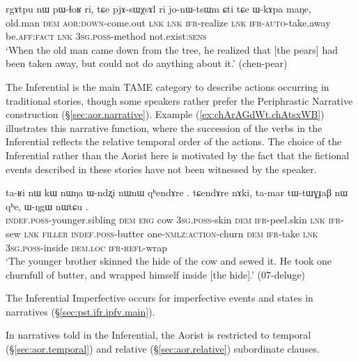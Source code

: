 \begin{exe}
\ex \label{ex:jonWtsWm.Cti}
\gll rgɤtpu nɯ pɯ-ɬoʁ ri, tɕe pjɤ-sɯχsɤl ri jo-nɯ-tsɯm ɕti tɕe ɯ-kɤpa maŋe,  \\
old.man \textsc{dem} \textsc{aor}:\textsc{down}-come.out \textsc{lnk} \textsc{lnk} \textsc{ifr}-realize \textsc{lnk} \textsc{ifr}-\textsc{auto}-take.away be.\textsc{aff}:\textsc{fact} \textsc{lnk} \textsc{3sg}.\textsc{poss}-method not.exist:\textsc{sens} \\
\glt `When the old man came down from the tree, he realized that [the pears] had been taken away, but could not do anything about it.' (chen-pear)
 \end{exe}

The Inferential is the main TAME category to describe actions occurring in traditional stories, though some speakers rather prefer the Periphrastic Narrative construction (§\ref{sec:aor.narrative}). Example (\ref{ex:chArAGdWt.chAtsxWB}) illustrates this narrative function, where the succession of the verbs in the Inferential reflects the relative temporal order of the actions. The choice of the Inferential rather than the Aorist here is motivated by the fact that the fictional events described in these stories have not been witnessed by the speaker. 


\begin{exe}
\ex \label{ex:chArAGdWt.chAtsxWB}
 \gll ta-ʁi nɯ kɯ nɯŋa ɯ-ndʐi nɯnɯ  qʰendɤre . tɕendɤre nɤki, ta-mar tɯ-tɯɣɟaβ nɯ  qʰe, ɯ-ŋgɯ nɯtɕu . \\
 \textsc{indef}.\textsc{poss}-younger.sibling \textsc{dem} \textsc{erg} cow \textsc{3sg}.\textsc{poss}-skin \textsc{dem} \textsc{ifr}-peel.skin \textsc{lnk} \textsc{ifr}-sew \textsc{lnk} \textsc{filler} \textsc{indef}.\textsc{poss}-butter one-\textsc{nmlz}:\textsc{action}-churn \textsc{dem} \textsc{ifr}-take \textsc{lnk} \textsc{3sg}.\textsc{poss}-inside \textsc{dem}.\textsc{loc} \textsc{ifr}-\textsc{refl}-wrap \\
 \glt `The younger brother skinned the hide of the cow and sewed it. He took one churnfull of butter, and wrapped himself inside [the hide].' (07-deluge)
\end{exe}

The Inferential Imperfective occurs for imperfective events and states in narratives (§\ref{sec:pst.ifr.ipfv.main}).

In narratives told in the Inferential, the Aorist is restricted to temporal (§\ref{sec:aor.temporal}) and relative (§\ref{sec:aor.relative}) subordinate clauses.

